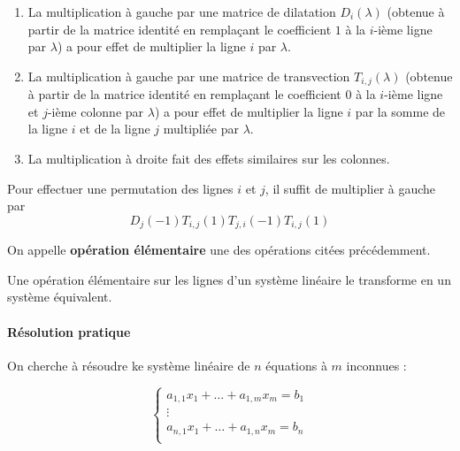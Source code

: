 	\begin{theorem}
		\begin{enumerate}[label=(\roman*)]
			\item La multiplication à gauche par une matrice de dilatation $D_i(\lambda)$ (obtenue à partir de la matrice identité en remplaçant le coefficient $1$ à la $i$-ième ligne par $\lambda$) a pour effet de multiplier la ligne $i$ par $\lambda$.
			\item La multiplication à gauche par une matrice de transvection $T_{i,j}(\lambda)$ (obtenue à partir de la matrice identité en remplaçant le coefficient $0$ à la $i$-ième ligne et $j$-ième colonne par $\lambda$) a pour effet de multiplier la ligne $i$ par la somme de la ligne $i$ et de la ligne $j$ multipliée par $\lambda$.
			\item La multiplication à droite fait des effets similaires sur les colonnes.
		\end{enumerate}
	\end{theorem}
	
	\begin{remark}
		Pour effectuer une permutation des lignes $i$ et $j$, il suffit de multiplier à gauche par
		\[ D_j(-1)T_{i,j}(1)T_{j,i}(-1)T_{i,j}(1) \]
	\end{remark}
	
	\begin{definition}
		On appelle \textbf{opération élémentaire} une des opérations citées précédemment.
	\end{definition}
	
	\begin{theorem}
		Une opération élémentaire sur les lignes d'un système linéaire le transforme en un système équivalent.
	\end{theorem}
	
	\paragraph{Résolution pratique}
	
	On cherche à résoudre  ke système linéaire de $n$ équations à $m$ inconnues :
	
	\[
	\begin{cases}
		a_{1,1} x_1 + \dots + a_{1,m} x_m = b_1 \\
		\vdots \\
		a_{n,1} x_1 + \dots + a_{1,n} x_m = b_n \\
	\end{cases}
	\tag{$S$}
	\]
	
